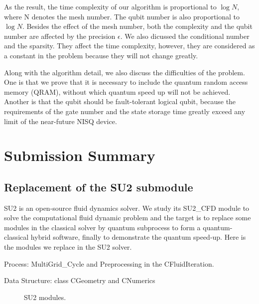 \documentclass[%
 reprint,
 amsmath,amssymb,
pra,
]{revtex4-1}
\begin{document}
As the result, the time complexity of our algorithm is proportional to $\log⁡ N$, where N denotes the mesh number. The qubit number is also proportional to $\log⁡ N$. Besides the effect of the mesh number, both the complexity and the qubit number are affected by the precision $\epsilon$. We also dicussed the conditional number and the sparsity. They affect the time complexity, however, they are considered as a constant in the problem because they will not change greatly.

Along with the algorithm detail, we also discuss the difficulties of the problem. One is that we prove that it is necessary to include the quantum random access memory (QRAM), without which quantum speed up will not be achieved. Another is that the qubit should be fault-tolerant logical qubit, because the requirements of the gate number and the state storage time greatly exceed any limit of the near-future NISQ device.

\section{Submission Summary}

\subsection{Replacement of the SU2 submodule}

SU2 is an open-source fluid dynamics solver. We study its SU2\_CFD module to solve the computational fluid dynamic problem and the target is to replace some modules in the classical solver by quantum subprocess to form a quantum-classical hybrid software, finally to demonstrate the quantum speed-up. Here is the modules we replace in the SU2 solver.

Process: MultiGrid\_Cycle and Preprocessing in the CFluidIteration.

Data Structure: class CGeometry and CNumerics

\begin{figure}[htbp]
     \caption{SU2 modules.}
    \label{SU2modules}
\end{figure}
\end{document}
